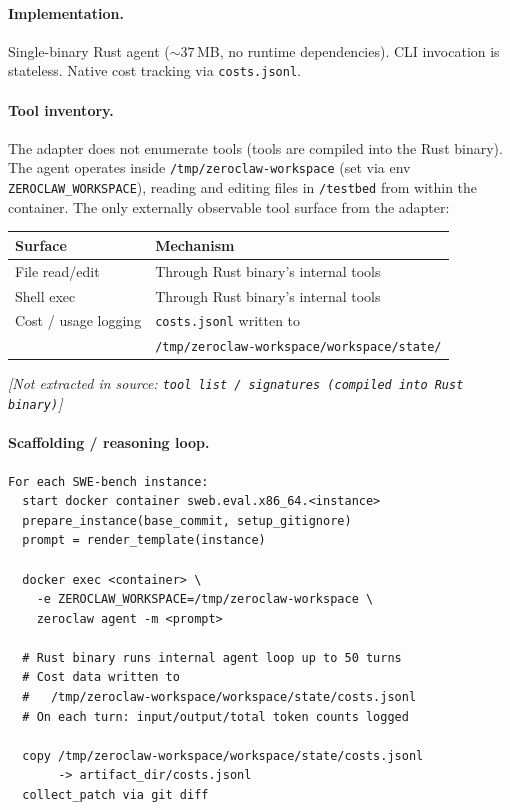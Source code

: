 \documentclass{llmxive}
\begin{document}
\paragraph{Implementation.}
Single-binary Rust agent (${\sim}37$\,MB, no runtime dependencies). CLI invocation is stateless. Native cost tracking via \texttt{costs.jsonl}.

\paragraph{Tool inventory.}
The adapter does not enumerate tools (tools are compiled into the Rust binary). The agent operates inside \texttt{/tmp/zeroclaw-workspace} (set via env \texttt{ZEROCLAW\_WORKSPACE}), reading and editing files in \texttt{/testbed} from within the container. The only externally observable tool surface from the adapter:

\begin{center}
\begin{tabular}{ll}
\toprule
\textbf{Surface} & \textbf{Mechanism} \\
\midrule
File read/edit          & Through Rust binary's internal tools \\
Shell exec              & Through Rust binary's internal tools \\
Cost / usage logging    & \texttt{costs.jsonl} written to \\
                        & \texttt{/tmp/zeroclaw-workspace/workspace/state/} \\
\bottomrule
\end{tabular}
\end{center}

\textit{[Not extracted in source: \texttt{tool list / signatures (compiled into Rust binary)}]}

\paragraph{Scaffolding / reasoning loop.}
\begin{verbatim}
For each SWE-bench instance:
  start docker container sweb.eval.x86_64.<instance>
  prepare_instance(base_commit, setup_gitignore)
  prompt = render_template(instance)

  docker exec <container> \
    -e ZEROCLAW_WORKSPACE=/tmp/zeroclaw-workspace \
    zeroclaw agent -m <prompt>

  # Rust binary runs internal agent loop up to 50 turns
  # Cost data written to
  #   /tmp/zeroclaw-workspace/workspace/state/costs.jsonl
  # On each turn: input/output/total token counts logged

  copy /tmp/zeroclaw-workspace/workspace/state/costs.jsonl
       -> artifact_dir/costs.jsonl
  collect_patch via git diff
\end{verbatim}
\end{document}
